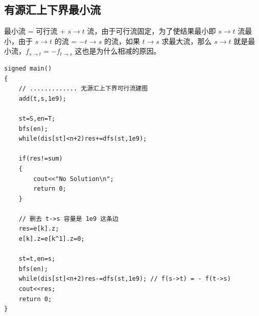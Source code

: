 \subsection{有源汇上下界最小流}
\par \noindent 最小流 = 可行流 + $s\to t$ 流，由于可行流固定，为了使结果最小即 $s\to t$ 流最小，由于 $s\to t$ 的流 = $-t\to s$ 的流，如果 $t\to s$ 求最大流，那么 $s\to t$ 就是最小流，$f_{s\to t}=-f_{t\to s}$ 这也是为什么相减的原因。

\begin{verbatim}
signed main()
{
    // ............. 无源汇上下界可行流建图
    add(t,s,1e9);

    st=S,en=T;
    bfs(en);
    while(dis[st]<n+2)res+=dfs(st,1e9);

    if(res!=sum)
    {
        cout<<"No Solution\n";
        return 0;
    }

    // 删去 t->s 容量是 1e9 这条边
    res=e[k].z;
    e[k].z=e[k^1].z=0;

    st=t,en=s;
    bfs(en);
    while(dis[st]<n+2)res-=dfs(st,1e9); // f(s->t) = - f(t->s)
    cout<<res;
    return 0;
}
\end{verbatim}